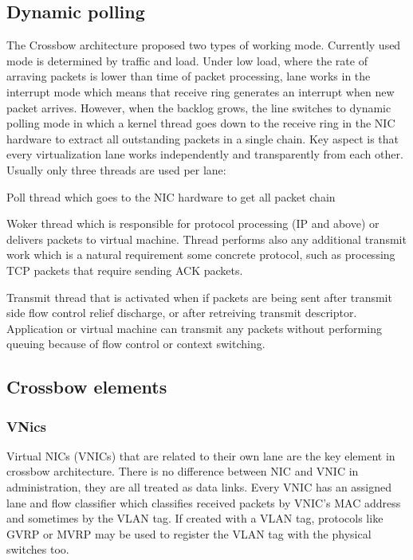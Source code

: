 \documentclass[11pt]{book}
\begin{document}
		\subsection{Dynamic polling}	
			
			The Crossbow architecture proposed two types of working mode. Currently used mode is determined by traffic and load. Under low load, where the rate of arraving packets is lower than
			time of packet processing, lane works in the interrupt mode which means that receive ring generates an interrupt when new packet arrives. However, when the backlog grows, the line 
			switches to dynamic polling mode in which a kernel thread goes down to the receive ring in the NIC hardware to extract all outstanding packets in a single chain. Key aspect is that 
			every virtualization lane works independently and transparently from each other. Usually only three threads are used per lane:
			
			\begin{enumeration}
				\item{Poll thread which goes to the NIC hardware to get all packet chain}
				\item{Woker thread which is responsible for protocol processing (IP and above) or delivers packets to virtual machine. Thread performs also any additional transmit work which is a natural 
				requirement some concrete protocol, such as processing TCP packets that require sending ACK packets.}
				\item{Transmit thread that is activated when if packets are being sent after transmit side flow control relief discharge, or after retreiving transmit descriptor. Application or virtual 
				machine can transmit any packets without performing queuing because of flow control or context switching.}
			\end{enumeration}

		
		\subsection{Crossbow elements}

			\subsubsection{VNics}
			Virtual NICs (VNICs) that are related to their own lane are the key element in crossbow architecture. There is no
			difference between NIC and VNIC in administration, they are all treated as data links. Every VNIC has an assigned
			lane and flow classifier which classifies received packets by VNIC's MAC address and sometimes by the VLAN tag.
			If created with a VLAN tag, protocols like GVRP or MVRP may be used to register the VLAN tag with the physical switches
			too.	
\end{document}
